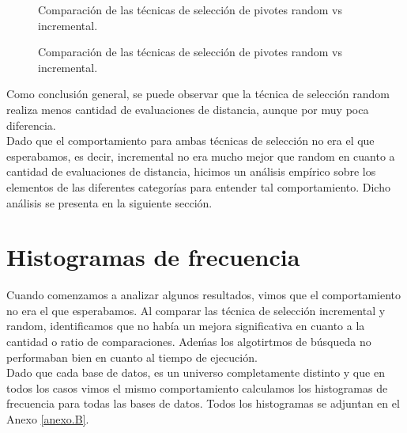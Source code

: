 \begin{figure}[tb]
\centering
{}
\caption{\small Comparaci\'on de las t\'ecnicas de selecci\'on de pivotes random vs incremental.}
\label{fig:ETS-1}
\end{figure}
\begin{figure}[tb]
\centering
{}
\caption{\small Comparaci\'on de las t\'ecnicas de selecci\'on de pivotes random vs incremental.}
\label{fig:ETS-2}

\end{figure}

Como conclusi\'on general, se puede observar que la t\'ecnica de selecci\'on random realiza menos cantidad de evaluaciones de distancia, aunque por muy poca diferencia.\\
 
Dado que el comportamiento para ambas t\'ecnicas de selecci\'on no era el que esperabamos, es decir, incremental no era mucho mejor que random en cuanto a cantidad de evaluaciones de distancia, hicimos un an\'alisis emp\'irico sobre los elementos de las diferentes categor\'ias para entender tal comportamiento. Dicho an\'alisis se presenta en la siguiente secci\'on.

\section{Histogramas de frecuencia}
 
Cuando comenzamos a analizar algunos resultados, vimos que el comportamiento no era el que esperabamos. Al comparar las  t\'ecnica de selecci\'on incremental y random, identificamos que no hab\'ia un mejora significativa en cuanto a la cantidad o ratio de comparaciones. Ade\'mas los algotirtmos de b\'usqueda no performaban bien en cuanto al tiempo de ejecución.\\

Dado que cada base de datos, es un universo completamente distinto y que en todos los casos vimos el mismo comportamiento calculamos los histogramas de frecuencia para todas las bases de datos. Todos los histogramas se adjuntan en el Anexo \ref{anexo.B}.\\\\

